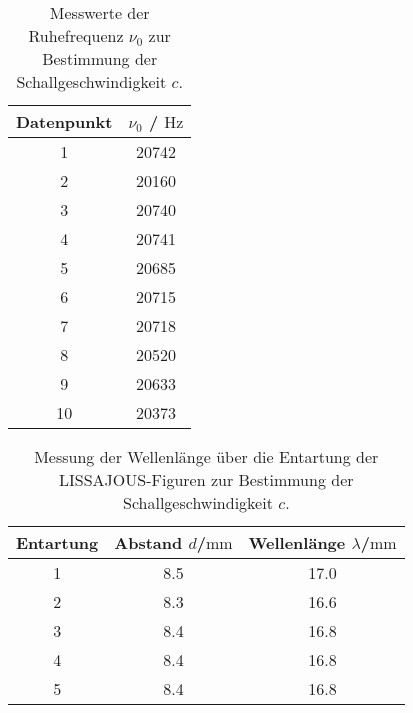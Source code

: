 \begin{table}
	\centering
	\caption{Messwerte der Ruhefrequenz $\nu_{\mathrm{0}}$ zur Bestimmung der Schallgeschwindigkeit $c$.}
	\label{tab:ruhefrequenz}
	\begin{tabular}{cc}
		\toprule
		Datenpunkt & $\nu_0$ / $\si{\hertz}$ \\
		\midrule
		1          & 20742                   \\
		2          & 20160                   \\
		3          & 20740                   \\
		4          & 20741                   \\
		5          & 20685                   \\
		6          & 20715                   \\
		7          & 20718                   \\
		8          & 20520                   \\
		9          & 20633                   \\
		10         & 20373                   \\
		\bottomrule
	\end{tabular}

\end{table}

\begin{table}
	\centering
	\caption{Messung der Wellenlänge über die Entartung der LISSAJOUS-Figuren zur Bestimmung der Schallgeschwindigkeit $c$.}
	\label{tab:juice}
	\begin{tabular}{ccc}
		\toprule
		Entartung & Abstand $d$/$\si{\milli\meter}$ & Wellenlänge $\lambda$/$\si{\milli\meter}$ \\
		\midrule
		1         & 8.5                             & 17.0                                       \\
		2         & 8.3                             & 16.6                                       \\
		3         & 8.4                             & 16.8                                       \\
		4         & 8.4                             & 16.8                                       \\
		5         & 8.4                             & 16.8                                       \\
		\bottomrule
	\end{tabular}
\end{table}
\FloatBarrier
